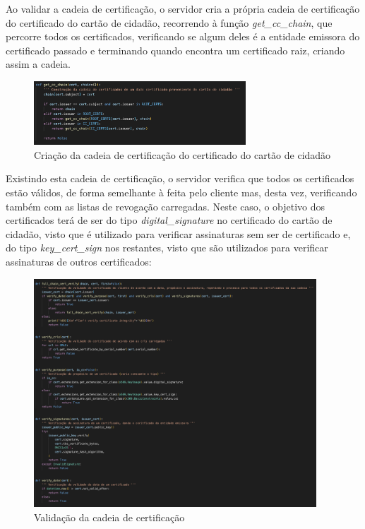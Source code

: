 \documentclass[10pt,english]{article}
\begin{document}
\par Ao validar a cadeia de certificação, o servidor cria a própria cadeia de certificação do certificado do cartão de cidadão, recorrendo à função \textit{get\_cc\_chain}, que percorre todos os certificados, verificando se algum deles é a entidade emissora do certificado passado e terminando quando encontra um certificado raiz, criando assim a cadeia.

\begin{figure}[!h]
        \centering
        \includegraphics[width=300]{images/get_cc_chain.png}
        \caption{Criação da cadeia de certificação do certificado do cartão de cidadão}
\end{figure}

\par Existindo esta cadeia de certificação, o servidor verifica que todos os certificados estão válidos, de forma semelhante à feita pelo cliente mas, desta vez, verificando também com as listas de revogação carregadas. Neste caso, o objetivo dos certificados terá de ser do tipo \textit{digital\_signature} no certificado do cartão de cidadão, visto que é utilizado para verificar assinaturas sem ser de certificado e, do tipo \textit{key\_cert\_sign} nos restantes, visto que são utilizados para verificar assinaturas de outros certificados:

\begin{figure}[!h]
        \centering
        \includegraphics[width=400]{images/chain_verify_server.png}
        \caption{Validação da cadeia de certificação}
\end{figure}
\end{document}
